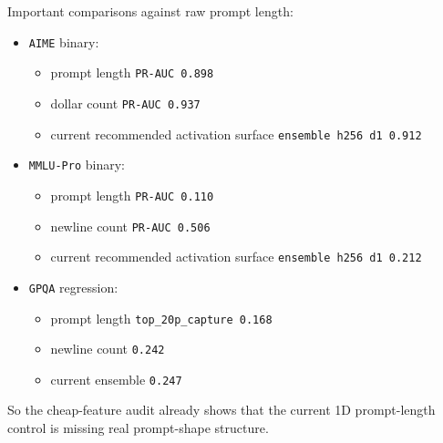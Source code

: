 \documentclass[11pt]{article}
\begin{document}
Important comparisons against raw prompt length:
\begin{itemize}[leftmargin=1.5em]
\item \texttt{AIME} binary:
  \begin{itemize}[leftmargin=1.5em]
  \item prompt length \texttt{PR-AUC 0.898}
  \item dollar count \texttt{PR-AUC 0.937}
  \item current recommended activation surface \texttt{ensemble h256 d1 0.912}
  \end{itemize}
\item \texttt{MMLU-Pro} binary:
  \begin{itemize}[leftmargin=1.5em]
  \item prompt length \texttt{PR-AUC 0.110}
  \item newline count \texttt{PR-AUC 0.506}
  \item current recommended activation surface \texttt{ensemble h256 d1 0.212}
  \end{itemize}
\item \texttt{GPQA} regression:
  \begin{itemize}[leftmargin=1.5em]
  \item prompt length \texttt{top\_20p\_capture 0.168}
  \item newline count \texttt{0.242}
  \item current ensemble \texttt{0.247}
  \end{itemize}
\end{itemize}

So the cheap-feature audit already shows that the current 1D prompt-length control is missing real prompt-shape structure.
\end{document}
